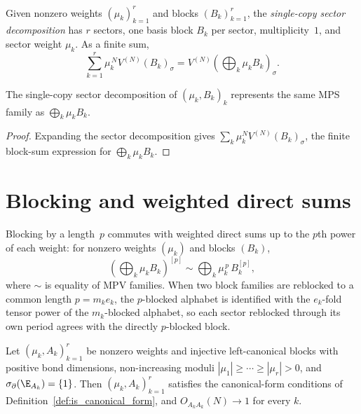 \begin{definition}
    \label{def:trivial_sector_decomp}
    \leanok
    Given nonzero weights $(\mu_k)_{k=1}^r$ and blocks $(B_k)_{k=1}^r$, the
    \emph{single-copy sector decomposition} has $r$ sectors, one basis block
    $B_k$ per sector, multiplicity~$1$, and sector weight $\mu_k$. As a finite
    sum,
    \[
        \sum_{k=1}^{r} \mu_k^{\,N} V^{(N)}(B_k)_\sigma
        =  V^{(N)}\!(\textstyle\bigoplus_k \mu_k B_k)_\sigma.
    \]
\end{definition}

\begin{lemma}
    \label{lem:trivial_sector_decomp_same_mpv}
    \leanok
    The single-copy sector decomposition of $(\mu_k,B_k)_k$ represents the same
    MPS family as $\bigoplus_k \mu_k B_k$.
\end{lemma}

\begin{proof}\leanok
    Expanding the sector decomposition gives $\sum_k \mu_k^N V^{(N)}(B_k)_\sigma$,
    the finite block-sum expression for $\bigoplus_k \mu_k B_k$.
\end{proof}

\section{Blocking and weighted direct sums}%
\label{subsec:internal_lean_only_labels}

Blocking by a length~$p$ commutes with weighted direct sums up to the $p$th power
of each weight: for nonzero weights $(\mu_k)$ and blocks $(B_k)$,
\[
    \left(\textstyle\bigoplus_k \mu_k B_k\right)^{[p]}
    \sim \textstyle\bigoplus_k \mu_k^{\,p}\, B_k^{[p]},
\]
where $\sim$ is equality of MPV families. When two block families are reblocked to
a common length $p = m_k e_k$, the $p$-blocked alphabet is identified with the
$e_k$-fold tensor power of the $m_k$-blocked alphabet, so each sector reblocked
through its own period agrees with the directly $p$-blocked block.

\begin{lemma}%
    \label{thm:canonical_from_primitive}
    \notready
    Let $(\mu_k,A_k)_{k=1}^r$ be nonzero weights and injective left-canonical
    blocks with positive bond dimensions, non-increasing moduli
    $|\mu_1|\ge\cdots\ge|\mu_r|>0$, and $\sigma_\partial(\E_{A_k}) = \{1\}$. Then
    $(\mu_k,A_k)_{k=1}^r$ satisfies the canonical-form conditions of
    Definition~\ref{def:is_canonical_form}, and $O_{A_k A_k}(N) \to 1$ for every
    $k$.
\end{lemma}

